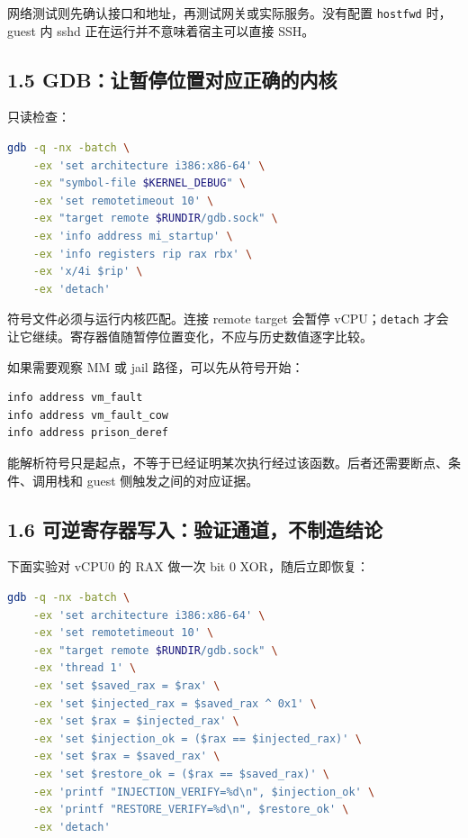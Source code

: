 \documentclass[
  11pt,
  UTF8,
  a4paper,
  fontset=fandol]{ctexart}
\newcommand{\passthrough}[1]{#1}
\begin{document}
网络测试则先确认接口和地址，再测试网关或实际服务。没有配置
\passthrough{\lstinline!hostfwd!} 时，guest 内 sshd
正在运行并不意味着宿主可以直接 SSH。

\subsection{1.5
GDB：让暂停位置对应正确的内核}\label{gdbux8ba9ux6682ux505cux4f4dux7f6eux5bf9ux5e94ux6b63ux786eux7684ux5185ux6838}

只读检查：

\begin{lstlisting}[language=sh]
gdb -q -nx -batch \
    -ex 'set architecture i386:x86-64' \
    -ex "symbol-file $KERNEL_DEBUG" \
    -ex 'set remotetimeout 10' \
    -ex "target remote $RUNDIR/gdb.sock" \
    -ex 'info address mi_startup' \
    -ex 'info registers rip rax rbx' \
    -ex 'x/4i $rip' \
    -ex 'detach'
\end{lstlisting}

符号文件必须与运行内核匹配。连接 remote target 会暂停
vCPU；\passthrough{\lstinline!detach!}
才会让它继续。寄存器值随暂停位置变化，不应与历史数值逐字比较。

如果需要观察 MM 或 jail 路径，可以先从符号开始：

\begin{lstlisting}
info address vm_fault
info address vm_fault_cow
info address prison_deref
\end{lstlisting}

能解析符号只是起点，不等于已经证明某次执行经过该函数。后者还需要断点、条件、调用栈和
guest 侧触发之间的对应证据。

\subsection{1.6
可逆寄存器写入：验证通道，不制造结论}\label{ux53efux9006ux5bc4ux5b58ux5668ux5199ux5165ux9a8cux8bc1ux901aux9053ux4e0dux5236ux9020ux7ed3ux8bba}

下面实验对 vCPU0 的 RAX 做一次 bit 0 XOR，随后立即恢复：

\begin{lstlisting}[language=sh]
gdb -q -nx -batch \
    -ex 'set architecture i386:x86-64' \
    -ex 'set remotetimeout 10' \
    -ex "target remote $RUNDIR/gdb.sock" \
    -ex 'thread 1' \
    -ex 'set $saved_rax = $rax' \
    -ex 'set $injected_rax = $saved_rax ^ 0x1' \
    -ex 'set $rax = $injected_rax' \
    -ex 'set $injection_ok = ($rax == $injected_rax)' \
    -ex 'set $rax = $saved_rax' \
    -ex 'set $restore_ok = ($rax == $saved_rax)' \
    -ex 'printf "INJECTION_VERIFY=%d\n", $injection_ok' \
    -ex 'printf "RESTORE_VERIFY=%d\n", $restore_ok' \
    -ex 'detach'
\end{lstlisting}
\end{document}

